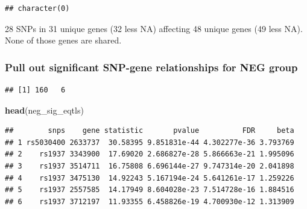 \documentclass[]{article}
\newenvironment{Shaded}{\begin{snugshade}}{\end{snugshade}}
\newcommand{\KeywordTok}[1]{\textcolor[rgb]{0.13,0.29,0.53}{\textbf{#1}}}
\newcommand{\FloatTok}[1]{\textcolor[rgb]{0.00,0.00,0.81}{#1}}
\newcommand{\StringTok}[1]{\textcolor[rgb]{0.31,0.60,0.02}{#1}}
\newcommand{\CommentTok}[1]{\textcolor[rgb]{0.56,0.35,0.01}{\textit{#1}}}
\newcommand{\OperatorTok}[1]{\textcolor[rgb]{0.81,0.36,0.00}{\textbf{#1}}}
\newcommand{\NormalTok}[1]{#1}
\begin{document}
\begin{verbatim}
## character(0)
\end{verbatim}

28 SNPs in 31 unique genes (32 less NA) affecting 48 unique genes (49
less NA). None of those genes are shared.

\subsubsection{Pull out significant SNP-gene relationships for NEG
group}\label{pull-out-significant-snp-gene-relationships-for-neg-group}

\begin{Shaded}
\end{Shaded}

\begin{verbatim}
## [1] 160   6
\end{verbatim}

\begin{Shaded}
\begin{Highlighting}[]
\KeywordTok{head}\NormalTok{(neg_sig_eqtls)}
\end{Highlighting}
\end{Shaded}

\begin{verbatim}
##        snps    gene statistic       pvalue          FDR     beta
## 1 rs5030400 2633737  30.58395 9.851831e-44 4.302277e-36 3.793769
## 2    rs1937 3343900  17.69020 2.686827e-28 5.866663e-21 1.995096
## 3    rs1937 3514711  16.75808 6.696144e-27 9.747314e-20 2.041898
## 4    rs1937 3475130  14.92243 5.167194e-24 5.641261e-17 1.259226
## 5    rs1937 2557585  14.17949 8.604028e-23 7.514728e-16 1.884516
## 6    rs1937 3712197  11.93355 6.458826e-19 4.700930e-12 1.313909
\end{verbatim}

\begin{Shaded}
\end{Shaded}
\end{document}

